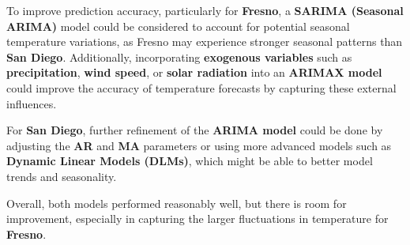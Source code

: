 \documentclass[
  11pt,
]{article}
\begin{document}
To improve prediction accuracy, particularly for \textbf{Fresno}, a
\textbf{SARIMA (Seasonal ARIMA)} model could be considered to account
for potential seasonal temperature variations, as Fresno may experience
stronger seasonal patterns than \textbf{San Diego}. Additionally,
incorporating \textbf{exogenous variables} such as
\textbf{precipitation}, \textbf{wind speed}, or \textbf{solar radiation}
into an \textbf{ARIMAX model} could improve the accuracy of temperature
forecasts by capturing these external influences.

For \textbf{San Diego}, further refinement of the \textbf{ARIMA model}
could be done by adjusting the \textbf{AR} and \textbf{MA} parameters or
using more advanced models such as \textbf{Dynamic Linear Models
(DLMs)}, which might be able to better model trends and seasonality.

Overall, both models performed reasonably well, but there is room for
improvement, especially in capturing the larger fluctuations in
temperature for \textbf{Fresno}.
\end{document}
